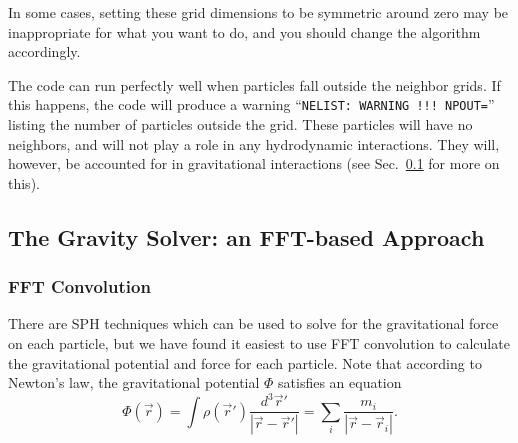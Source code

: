 In some cases, setting these grid dimensions to be symmetric around
zero may be inappropriate for what you want to do, and you should
change the algorithm accordingly.  

The code can run perfectly well when particles fall outside the
neighbor grids.  If this happens, the code will produce a warning
``{\tt NELIST: WARNING !!! NPOUT=}'' listing the number of particles
outside the grid.  These particles will have no neighbors, and will
not play a role in any hydrodynamic interactions.  They will, however,
be accounted for in gravitational interactions (see Sec.~\ref{nm:gr} for more
on this).

\subsection{The Gravity Solver: an FFT-based Approach}
\label{nm:gr}
\subsubsection{FFT Convolution}\label{nm:gr:fft}
There are SPH techniques which can be used to solve for the
gravitational force on each particle, but we have found it easiest to
use FFT convolution to calculate the gravitational potential and
force for each particle.  Note that according to Newton's law, the
gravitational potential $\Phi$ satisfies an equation 
\begin{equation}
\Phi(\vec{r})= \int \rho({\vec{r}}')
\frac{d^3 {\vec{r}}'}{|\vec{r}-{\vec{r}}'|} = 
\sum_i \frac{m_i}{|\vec{r}-\vec{r}_i|} .
\end{equation}

